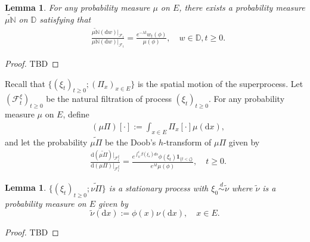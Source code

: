 \documentclass[12pt,a4paper]{amsart}
\numberwithin{equation}{section}
\theoremstyle{plain}
\newtheorem{lem}[thm]{Lemma}
\theoremstyle{definition}
\theoremstyle{remark}
\begin{document}
\begin{lem} \label{thm:E.1}
	For any probability measure $\mu$ on $E$, there exists a probability measure $\widetilde {\mu\mathbb N}$ on $\mathbb D$ satisfying that
	\begin{align} 
	& \frac{\widetilde {\mu \mathbb N}(\mathrm dw)|_{\mathscr F_t} }{\mu\mathbb N(\mathrm dw)|_{\mathscr F_t}}  = \frac{e^{-\lambda t}w_t(\phi)}{\mu(\phi)}, \quad w\in \mathbb D, t\geq 0.
	\end{align}
\end{lem}
\begin{proof}
	TBD
\end{proof}
	
	Recall that $\{(\xi_t)_{t\geq 0}; (\Pi_x)_{x\in E}\}$ is the spatial motion of the superprocess. 
	Let  $(\mathscr F_t^{\xi})_{t\geq 0}$ be the natural filtration of process $(\xi_t)_{t\geq 0}$.
	For any probability measure $\mu$ on $E$, define
\begin{align} 
& (\mu \Pi)[\cdot] := \int_{x\in E} \Pi_x[\cdot]\mu(\mathrm dx),
\end{align}
	and let the probability $\widetilde {\mu \Pi}$ be the Doob's $h$-transform of $\mu\Pi$ given by
\begin{align} 
	&  \frac{\mathrm d (\widetilde{\mu \Pi})|_{\mathscr F^\xi_t}}{\mathrm d (\mu \Pi)|_{\mathscr F^\xi_t}} 
	=\frac{e^{\int_0^t \beta(\xi_s)ds}\phi(\xi_t) \mathbf 1_{\{t<\zeta\}}}{e^{\lambda t}\mu(\phi)}, 
	\quad t\geq 0.
\end{align}

\begin{lem} \label{thm:E.15}
	$\{(\xi_t)_{t\geq 0}; \widetilde{\nu \Pi}\}$ is a stationary process with $\xi_0 \overset{d}\sim \widetilde \nu$ where $\widetilde \nu$ is a probability measure on $E$ given by \[\widetilde \nu(\mathrm dx) := \phi(x) \nu(\mathrm dx), \quad x\in E.\]
\end{lem}
\begin{proof}
	TBD
\end{proof}
\end{document}
